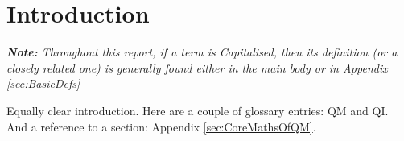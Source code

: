 \section*{Introduction}
\label{sec:Intro}

{\it
\textbf{Note:} Throughout this report, if a term is Capitalised, then its definition (or a closely related one) is
generally found either in the main body or in Appendix \ref{sec:BasicDefs} \\
}

Equally clear introduction.
Here are a couple of glossary entries: \gls{QM} and \gls{QI}.
And a reference to a section: Appendix \ref{sec:CoreMathsOfQM}.


